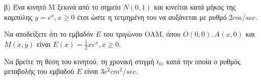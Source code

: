 β) Ένα κινητό Μ ξεκινά από το σημείο $N(0,1)$ και κινείται κατά μήκος της καμπύλης $y = e^x, x \ge 0$ έτσι ώστε η τετμημένη του να αυξάνεται με ρυθμό $2cm/sec$.
\begin{rlist}
\item Να αποδείξετε ότι το εμβαδόν $E$ του τριγώνου OAM, όπου $O(0,0), A(x,0)$ και $M(x,y)$ είναι $E(x) = \frac{1}{2}xe^x, x \ge 0$. 
\item Να βρείτε τη θέση του κινητού, τη χρονική στιγμή $t_0$, κατά την οποία ο ρυθμός μεταβολής του εμβαδού $E$ είναι $3e^2 cm^2/sec$. 
\end{rlist}